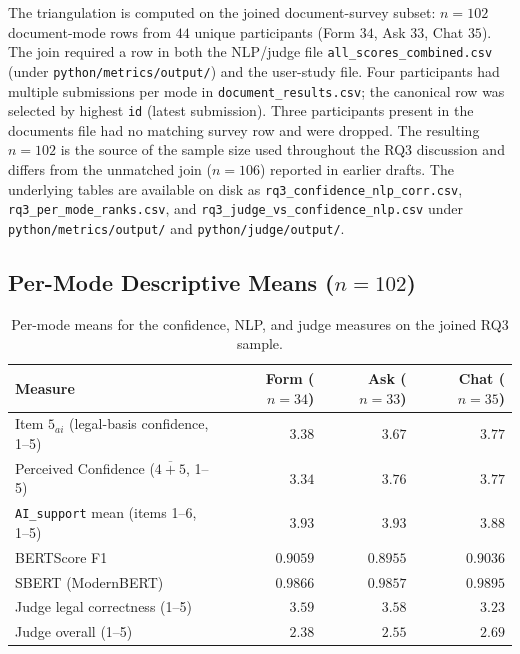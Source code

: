 The triangulation is computed on the joined document-survey
subset: $n = 102$ document-mode rows from $44$ unique participants
(Form $34$, Ask $33$, Chat $35$). The join required a row in both
the NLP/judge file
\texttt{all\_\allowbreak{}scores\_\allowbreak{}combined.csv} (under
\texttt{python/\allowbreak{}metrics/\allowbreak{}output/}) and the
user-study file. Four participants had multiple submissions per
mode in \texttt{document\_results.csv}; the canonical row was
selected by highest \texttt{id} (latest submission). Three
participants present in the documents file had no matching survey
row and were dropped. The resulting $n = 102$ is the source of the
sample size used throughout the RQ3 discussion and differs from
the unmatched join ($n = 106$) reported in earlier drafts. The
underlying tables are available on disk as
\texttt{rq3\_\allowbreak{}confidence\_\allowbreak{}nlp\_\allowbreak{}corr.csv},
\texttt{rq3\_\allowbreak{}per\_\allowbreak{}mode\_\allowbreak{}ranks.csv},
and
\texttt{rq3\_\allowbreak{}judge\_\allowbreak{}vs\_\allowbreak{}confidence\_\allowbreak{}nlp.csv}
under \texttt{python/\allowbreak{}metrics/\allowbreak{}output/} and
\texttt{python/\allowbreak{}judge/\allowbreak{}output/}.

\subsection{Per-Mode Descriptive Means ($n = 102$)}

\begin{table}[H]
\centering
\caption{Per-mode means for the confidence, NLP, and judge measures
on the joined RQ3 sample.}
\label{tab:app-corr-means}
\small
\begin{tabular}{@{}l r r r@{}}
\toprule
Measure & Form ($n = 34$) & Ask ($n = 33$) & Chat ($n = 35$) \\
\midrule
Item $5_{ai}$ (legal-basis confidence, 1--5)     & $3.38$ & $3.67$ & $3.77$ \\
Perceived Confidence ($\overline{4{+}5}$, 1--5)  & $3.34$ & $3.76$ & $3.77$ \\
\texttt{AI\_support} mean (items 1--6, 1--5)     & $3.93$ & $3.93$ & $3.88$ \\
BERTScore F1                                 & $0.9059$ & $0.8955$ & $0.9036$ \\
SBERT (ModernBERT)                           & $0.9866$ & $0.9857$ & $0.9895$ \\
Judge legal correctness (1--5)               & $3.59$ & $3.58$ & $3.23$ \\
Judge overall (1--5)                         & $2.38$ & $2.55$ & $2.69$ \\
\bottomrule
\end{tabular}
\end{table}


